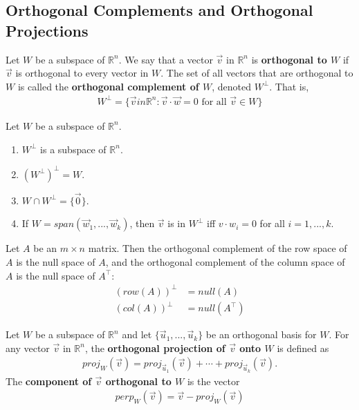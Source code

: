 \documentclass{article}
\begin{document}
\subsection{Orthogonal Complements and Orthogonal Projections}
\begin{definition}
    Let $W$ be a subspace of $\mathbb{R}^n$. We say that a vector $\vec v$ in $\mathbb{R}^n$ is \textbf{orthogonal to $W$} if $\vec v$ is orthogonal to every vector in $W$. The set of all vectors that are orthogonal to $W$ is called the \textbf{orthogonal complement of $W$}, denoted $W^{\perp}$. That is,
    \begin{align*}
        W^{\perp} = \{\vec v in \mathbb{R}^n:\vec v \cdot \vec w = 0 \text{ for all }\vec v\in W\}
    \end{align*}
\end{definition}
\begin{theorem}
    Let $W$ be a subspace of $\mathbb{R}^n$.
    \begin{enumerate}
        \item $W^{\perp}$ is a subspace of $\mathbb{R}^n$.
        \item $\left(W^{\perp}\right)^{\perp}=W$.
        \item $W\cap W^{\perp}=\{\vec 0\}$.
        \item If $W=span({\vec w_1, ..., \vec w_k})$, then $\vec v$ is in $W^{\perp}$ iff $v\cdot w_i=0$ for all $i=1,...,k$.
    \end{enumerate}
\end{theorem}
\begin{theorem}
    Let $A$ be an $m\times n$ matrix. Then the orthogonal complement of the row space of $A$ is the null space of $A$, and the orthogonal complement of the column space of $A$ is the null space of $A^\intercal $:
    \begin{align*}
        (row(A))^{\perp} & =null(A)            \\
        (col(A))^{\perp} & =null(A^\intercal )
    \end{align*}
\end{theorem}
\begin{definition}
    Let $W$ be a subspace of $\mathbb{R}^n$ and let $\{\vec u_1, ..., \vec u_k\}$ be an orthogonal basis for $W$.
    For any vector $\vec v$ in $\mathbb{R}^n$, the \textbf{orthogonal projection of $\vec v$ onto $W$} is defined as
    \begin{align*}
        proj_W(\vec v)=proj_{\vec u_1}(\vec v) + \cdots + proj_{\vec u_k}(\vec v).
    \end{align*}
    The \textbf{component of $\vec v$ orthogonal to $W$} is the vector
    \begin{align*}
        perp_W(\vec v) = \vec v - proj_W(\vec v)
    \end{align*}
\end{definition}
\end{document}
